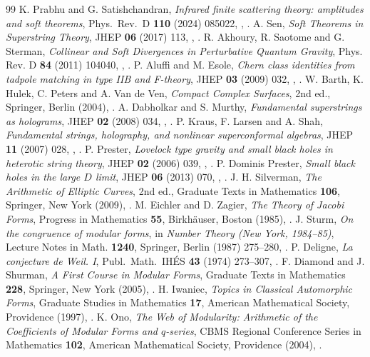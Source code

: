 \begin{thebibliography}{99}
 K. Prabhu and G. Satishchandran, \emph{Infrared finite scattering theory: amplitudes and soft theorems}, Phys.\ Rev.\ D \textbf{110} (2024) 085022, , .
 A. Sen, \emph{Soft Theorems in Superstring Theory}, JHEP \textbf{06} (2017) 113, , .
 R. Akhoury, R. Saotome and G. Sterman, \emph{Collinear and Soft Divergences in Perturbative Quantum Gravity}, Phys. Rev. D \textbf{84} (2011) 104040, , .
 P. Aluffi and M. Esole, \emph{Chern class identities from tadpole matching in type IIB and F-theory}, JHEP \textbf{03} (2009) 032, , .
 W. Barth, K. Hulek, C. Peters and A. Van de Ven, \emph{Compact Complex Surfaces}, 2nd ed., Springer, Berlin (2004), .
 A. Dabholkar and S. Murthy, \emph{Fundamental superstrings as holograms}, JHEP \textbf{02} (2008) 034, , .
 P. Kraus, F. Larsen and A. Shah, \emph{Fundamental strings, holography, and nonlinear superconformal algebras}, JHEP \textbf{11} (2007) 028, , .
 P. Prester, \emph{Lovelock type gravity and small black holes in heterotic string theory}, JHEP \textbf{02} (2006) 039, , .
 P. Dominis Prester, \emph{Small black holes in the large $D$ limit}, JHEP \textbf{06} (2013) 070, , .
 J. H. Silverman, \emph{The Arithmetic of Elliptic Curves}, 2nd ed., Graduate Texts in Mathematics \textbf{106}, Springer, New York (2009), .
 M. Eichler and D. Zagier, \emph{The Theory of Jacobi Forms}, Progress in Mathematics \textbf{55}, Birkh\"auser, Boston (1985), .
 J. Sturm, \emph{On the congruence of modular forms}, in \emph{Number Theory (New York, 1984--85)}, Lecture Notes in Math. \textbf{1240}, Springer, Berlin (1987) 275--280, .
 P. Deligne, \emph{La conjecture de Weil. I}, Publ.\ Math.\ IH\'ES \textbf{43} (1974) 273--307, .
 F. Diamond and J. Shurman, \emph{A First Course in Modular Forms}, Graduate Texts in Mathematics \textbf{228}, Springer, New York (2005), .
 H. Iwaniec, \emph{Topics in Classical Automorphic Forms}, Graduate Studies in Mathematics \textbf{17}, American Mathematical Society, Providence (1997), .
 K. Ono, \emph{The Web of Modularity: Arithmetic of the Coefficients of Modular Forms and $q$-series}, CBMS Regional Conference Series in Mathematics \textbf{102}, American Mathematical Society, Providence (2004), .
\end{thebibliography}
